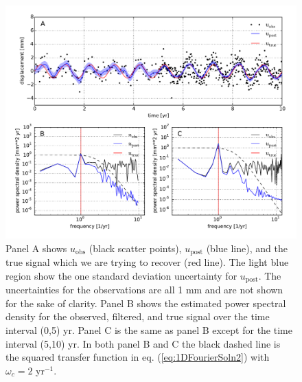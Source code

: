 \documentclass[10pt,a4paper]{article}
\begin{document}
\begin{figure}
\includegraphics[scale=0.7]{figures/fig2}
\caption{Panel A shows $u_\mathrm{obs}$ (black scatter points), $u_\mathrm{post}$ (blue line), and the true signal which we are trying to recover (red line).  The light blue region show the one standard deviation uncertainty for $u_\mathrm{post}$. The uncertainties for the observations are all 1 mm and are not shown for the sake of clarity.  Panel B shows the estimated power spectral density for the observed, filtered, and true signal over the time interval (0,5) yr. Panel C is the same as panel B except for the time interval (5,10) yr.  In both panel B and C the black dashed line is the squared transfer function in eq. (\ref{eq:1DFourierSoln2}) with $\omega_c=2$ yr$^{-1}$.}   
\label{fig:Demo2}
\end{figure}
\end{document}
